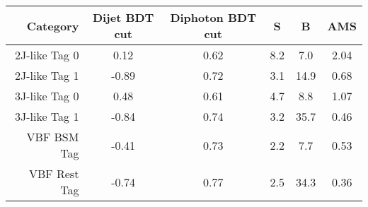 \begin{tabular}{ r | c | c | c | c | c } 
\hline 
Category       & Dijet BDT cut & Diphoton BDT cut & S & B & AMS \\ 
\hline 
2J-like  Tag 0 & 0.12         & 0.62             & 8.2    & 7.0        & 2.04         \\
2J-like  Tag 1 & -0.89        & 0.72             & 3.1    & 14.9       & 0.68         \\
3J-like  Tag 0 & 0.48         & 0.61             & 4.7    & 8.8        & 1.07         \\
3J-like  Tag 1 & -0.84        & 0.74             & 3.2    & 35.7       & 0.46         \\
VBF BSM  Tag   & -0.41        & 0.73             & 2.2    & 7.7        & 0.53         \\
VBF Rest Tag   & -0.74        & 0.77             & 2.5    & 34.3       & 0.36         \\
\hline 
\end{tabular}
